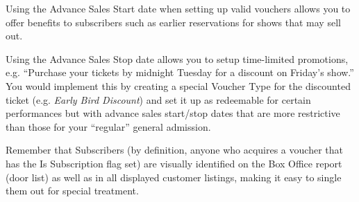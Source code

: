 Using the Advance Sales Start date when setting up valid vouchers allows
you to offer benefits to subscribers such as earlier reservations for
shows that may sell out.

Using the Advance Sales Stop date allows you to setup time-limited
promotions, e.g. ``Purchase your tickets by midnight Tuesday for a
discount on Friday's show.''  You would implement this by creating a
special Voucher Type for the discounted ticket (e.g. \emph{Early Bird
  Discount}) and set it up as redeemable for certain performances but
with advance sales start/stop dates that are more restrictive than those
for your ``regular'' general admission.

Remember that Subscribers (by definition, anyone who acquires a voucher
that has the Is Subscription flag set) are visually identified on the
Box Office report (door list) as well as in all displayed customer
listings, making it easy to single them out for special treatment.

